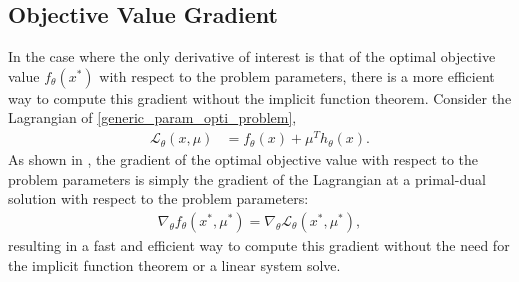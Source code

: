\subsection{Objective Value Gradient}
%
In the case where the only derivative of interest is that of the optimal objective value $f_\theta(x^*)$ with respect to the problem parameters, there is a more efficient way to compute this gradient without the implicit function theorem. Consider the Lagrangian of \eqref{generic_param_opti_problem},
\begin{align}
    \mathcal{L}_\theta (x, \mu) &= f_\theta(x) + \mu^Th_\theta(x).
\end{align}
As shown in \cite{castillo2006}, the gradient of the optimal objective value with respect to the problem parameters is simply the gradient of the Lagrangian at a primal-dual solution with respect to the problem parameters:
\begin{align}
    \nabla_\theta f_\theta(x^*, \mu^*)= \nabla_\theta \mathcal{L}_\theta(x^*, \mu^*), \label{eq:lag_grad}
\end{align}
resulting in a fast and efficient way to compute this gradient without the need for the implicit function theorem or a linear system solve.


